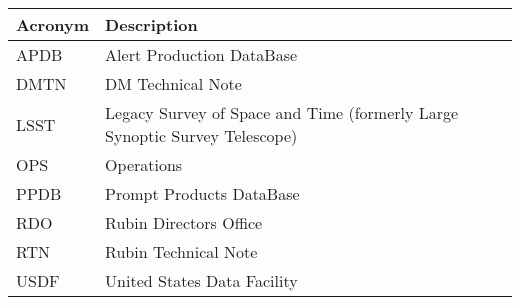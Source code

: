 \addtocounter{table}{-1}
\begin{longtable}{p{}p{}}\hline
\textbf{Acronym} & \textbf{Description}  \\\hline

APDB & Alert Production DataBase \\\hline
DMTN & DM Technical Note \\\hline
LSST & Legacy Survey of Space and Time (formerly Large Synoptic Survey Telescope) \\\hline
OPS & Operations \\\hline
PPDB & Prompt Products DataBase \\\hline
RDO & Rubin Directors Office \\\hline
RTN & Rubin Technical Note \\\hline
USDF & United States Data Facility \\\hline
\end{longtable}
